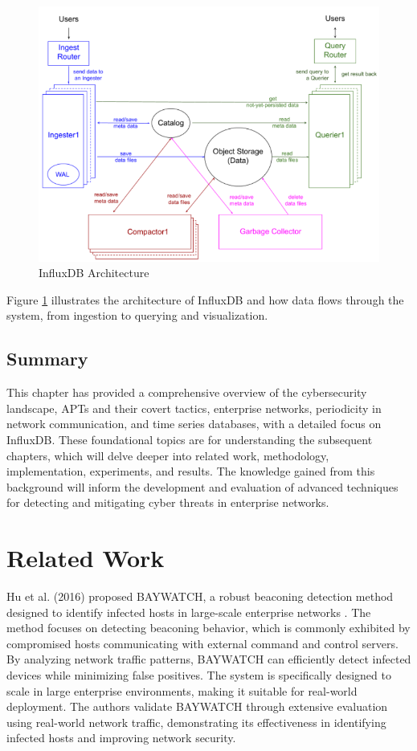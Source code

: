 \begin{figure}
    \centering
    \includegraphics[width=\textwidth]{../Thesis_Docs/media/influxdb_architecture.png}
    \caption{InfluxDB Architecture \cite{influxdb2023}}
    \label{fig:influxdb_architecture}
\end{figure}

Figure \ref{fig:influxdb_architecture} illustrates the architecture of InfluxDB and how data flows through the system, from ingestion to querying and visualization.

\section{Summary}

This chapter has provided a comprehensive overview of the cybersecurity landscape, APTs and their covert tactics, enterprise networks, periodicity in network communication, and time series databases, with a detailed focus on InfluxDB. These foundational topics are  for understanding the subsequent chapters, which will delve deeper into related work, methodology, implementation, experiments, and results. The knowledge gained from this background will inform the development and evaluation of advanced techniques for detecting and mitigating cyber threats in enterprise networks.
\chapter{Related Work}

Hu et al. (2016) proposed BAYWATCH, a robust beaconing detection method designed to identify infected hosts in large-scale enterprise networks \cite{hu2016baywatch}. The method focuses on detecting beaconing behavior, which is commonly exhibited by compromised hosts communicating with external command and control servers. By analyzing network traffic patterns, BAYWATCH can efficiently detect infected devices while minimizing false positives. The system is specifically designed to scale in large enterprise environments, making it suitable for real-world deployment. The authors validate BAYWATCH through extensive evaluation using real-world network traffic, demonstrating its effectiveness in identifying infected hosts and improving network security.

